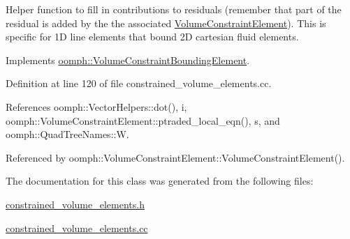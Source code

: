 Helper function to fill in contributions to residuals (remember that part of the residual is added by the the associated \hyperlink{classoomph_1_1VolumeConstraintElement}{Volume\+Constraint\+Element}). This is specific for 1D line elements that bound 2D cartesian fluid elements. 



Implements \hyperlink{classoomph_1_1VolumeConstraintBoundingElement_a717f1085709bd8820b8043ff94ecb0c5}{oomph\+::\+Volume\+Constraint\+Bounding\+Element}.



Definition at line 120 of file constrained\+\_\+volume\+\_\+elements.\+cc.



References oomph\+::\+Vector\+Helpers\+::dot(), i, oomph\+::\+Volume\+Constraint\+Element\+::ptraded\+\_\+local\+\_\+eqn(), s, and oomph\+::\+Quad\+Tree\+Names\+::W.



Referenced by oomph\+::\+Volume\+Constraint\+Element\+::\+Volume\+Constraint\+Element().



The documentation for this class was generated from the following files\+:\begin{DoxyCompactItemize}
\item 
\hyperlink{constrained__volume__elements_8h}{constrained\+\_\+volume\+\_\+elements.\+h}\item 
\hyperlink{constrained__volume__elements_8cc}{constrained\+\_\+volume\+\_\+elements.\+cc}\end{DoxyCompactItemize}

